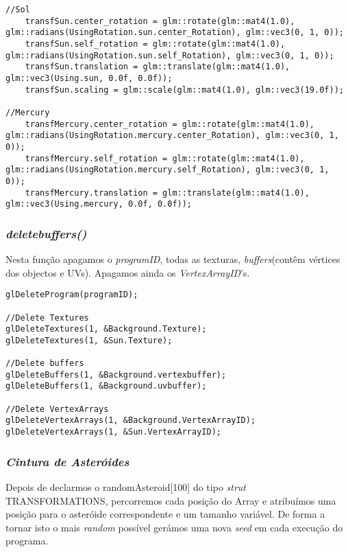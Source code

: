 \begin{lstlisting}[caption=\textit{ Pequeno excerto da função CelestialBodiesPosition()}.]
//Sol
	transfSun.center_rotation = glm::rotate(glm::mat4(1.0), glm::radians(UsingRotation.sun.center_Rotation), glm::vec3(0, 1, 0));
	transfSun.self_rotation = glm::rotate(glm::mat4(1.0), glm::radians(UsingRotation.sun.self_Rotation), glm::vec3(0, 1, 0));
	transfSun.translation = glm::translate(glm::mat4(1.0), glm::vec3(Using.sun, 0.0f, 0.0f));
	transfSun.scaling = glm::scale(glm::mat4(1.0), glm::vec3(19.0f));

//Mercury
	transfMercury.center_rotation = glm::rotate(glm::mat4(1.0), glm::radians(UsingRotation.mercury.center_Rotation), glm::vec3(0, 1, 0));
	transfMercury.self_rotation = glm::rotate(glm::mat4(1.0), glm::radians(UsingRotation.mercury.self_Rotation), glm::vec3(0, 1, 0));
	transfMercury.translation = glm::translate(glm::mat4(1.0), glm::vec3(Using.mercury, 0.0f, 0.0f));
\end{lstlisting}

\subsubsection{\textit{deletebuffers()}}
Nesta função apagamos o \textit{programID}, todas as texturas, \textit{buffers}(contêm vértices dos objectos e UVs). Apagamos ainda os \textit{VertexArrayID}'s.
\begin{lstlisting}[caption=\textit{ Pequeno excerto da função deletebuffers()}.]
glDeleteProgram(programID);

//Delete Textures
glDeleteTextures(1, &Background.Texture);
glDeleteTextures(1, &Sun.Texture);

//Delete buffers
glDeleteBuffers(1, &Background.vertexbuffer);
glDeleteBuffers(1, &Background.uvbuffer);

//Delete VertexArrays
glDeleteVertexArrays(1, &Background.VertexArrayID);
glDeleteVertexArrays(1, &Sun.VertexArrayID);
\end{lstlisting}

\subsubsection{\textit{Cintura de Asteróides}}
Depois de declarmos o randomAsteroid[100]  do tipo \textit{strut} TRANSFORMATIONS, percorremos cada posição do Array e atribuímos uma posição para o asteróide correspondente e um tamanho variável. De forma a tornar isto o mais \textit{random} possível gerámos uma nova \textit{seed} em cada execução do programa.


